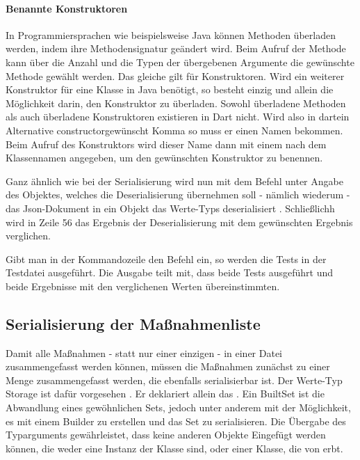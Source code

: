 \paragraph{Benannte Konstruktoren} In Programmiersprachen wie beispielsweise Java können Methoden überladen werden, indem ihre Methodensignatur geändert wird.
Beim Aufruf der Methode kann über die Anzahl und die Typen der übergebenen Argumente die gewünschte Methode gewählt werden.
Das gleiche gilt für Konstruktoren.
Wird ein weiterer Konstruktor für eine Klasse in Java benötigt, so besteht einzig und allein die Möglichkeit darin, den Konstruktor zu überladen.
Sowohl überladene Methoden als auch überladene Konstruktoren existieren in Dart nicht.
Wird also in dartein Alternative constructorgewünscht Komma so muss er einen Namen bekommen.
Beim Aufruf des Konstruktors wird dieser Name dann mit einem  nach dem Klassennamen angegeben, um den gewünschten Konstruktor zu benennen.


Ganz ähnlich wie bei der Serialisierung wird nun mit dem Befehl    unter Angabe des Objektes, welches die Deserialisierung übernehmen soll - nämlich wiederum  - das Json-Dokument in ein Objekt das Werte-Typs  deserialisiert . Schließlichh wird in Zeile 56 das Ergebnis der Deserialisierung mit dem gewünschten Ergebnis verglichen.



Gibt man in der Kommandozeile den Befehl    ein, so werden die Tests in der Testdatei ausgeführt. Die Ausgabe  teilt mit, dass beide Tests ausgeführt und beide Ergebnisse mit den verglichenen Werten übereinstimmten.

\subsection{Serialisierung der Maßnahmenliste}

Damit alle Maßnahmen - statt nur einer einzigen - in einer Datei zusammengefasst werden können, müssen die Maßnahmen zunächst zu einer Menge zusammengefasst werden, die ebenfalls serialisierbar ist.
Der Werte-Typ Storage ist dafür vorgesehen \Lst{\ref{lst:Schritt1WerteTypStorage}}.
Er deklariert allein das  .
Ein BuiltSet ist die Abwandlung eines gewöhnlichen Sets, jedoch unter anderem mit der Möglichkeit, es mit einem Builder zu erstellen und das Set zu serialisieren.
Die Übergabe des Typarguments  gewährleistet, dass keine anderen Objekte Eingefügt werden können, die weder eine Instanz der Klasse  sind, oder einer Klasse, die von  erbt.

